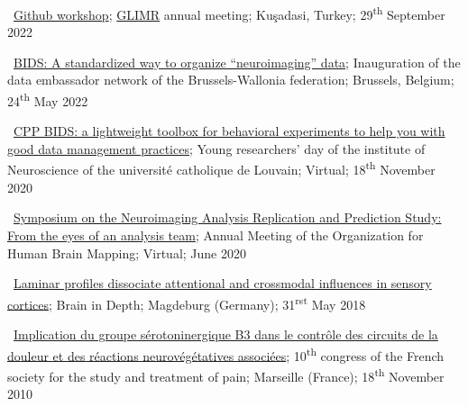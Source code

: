 \textbullet~\href{https://docs.google.com/presentation/d/1508GI_iLxyRwzJtWmnSQuSnfuGEUCaVXHguu8FRA4dI/}{Github workshop};
\href{https://glimr.eu/}{GLIMR} annual meeting;
Kuşadasi, Turkey;
29\textsuperscript{th} September 2022

\textbullet~\href{https://osf.io/h7gcm}{BIDS: A standardized way to organize “neuroimaging” data};
Inauguration of the data embassador network of the Brussels-Wallonia federation;
Brussels, Belgium;
24\textsuperscript{th} May 2022

\textbullet~\href{https://osf.io/y7cjn/}{CPP BIDS: a lightweight toolbox for behavioral experiments to help you with good data management practices};
Young researchers' day of the institute of Neuroscience of the université catholique de Louvain;
Virtual;
18\textsuperscript{th} November 2020

\textbullet~\href{https://osf.io/b8p9e/}{Symposium on the Neuroimaging Analysis
Replication and Prediction Study: From the eyes of an analysis team};
Annual Meeting of the Organization for Human Brain Mapping;
Virtual;
June 2020

\textbullet~\href{https://osf.io/b8p9e/}{Laminar profiles dissociate attentional and crossmodal influences in sensory cortices};
Brain in Depth;
Magdeburg (Germany);
31\textsuperscript{rst} May 2018

\textbullet~\href{https://osf.io/r7gfm/}{Implication du groupe sérotoninergique B3 dans le contrôle des circuits de la douleur et des réactions neurovégétatives associées};
10\textsuperscript{th} congress of the French society for the study and treatment of pain;
Marseille (France);
18\textsuperscript{th} November 2010
